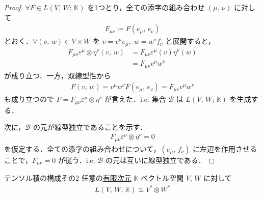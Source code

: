 \documentclass[rep_main]{subfiles}
\begin{document}
\begin{proof}
	$\forall F  \in L(V,\, W;\, \mathbb{K})$ を1つとり，全ての添字の組み合わせ $(\mu,\, \nu)$ に対して
	\begin{align}
		F_{\mu\nu} \coloneqq F(e_\mu,\, e_\nu)
	\end{align}
	とおく．$\forall (v,\, w) \in V \times W$ を $v = v^\mu e_\mu,\; w = w^\nu f_\nu$ と展開すると，
	\begin{align}
		F_{\mu\nu} \varepsilon^\mu \otimes \eta^\nu (v,\, w) &= F_{\mu\nu} \varepsilon^{\mu}(v) \eta^\nu(w) \\
		&= F_{\mu\nu} v^\mu w^\nu
	\end{align}
	が成り立つ．一方，双線型性から
	\begin{align}
		F(v,\, w) = v^\mu w^\nu F(e_\mu,\, e_\nu) = F_{\mu\nu} v^\mu w^\nu
	\end{align}
	も成り立つので $F = F_{\mu\nu} \varepsilon^\mu \otimes \eta^\nu$ が言えた．i.e. 集合 $\mathcal{B}$ は $L(V,\, W;\, \mathbb{K})$ を生成する．

	次に，$\mathcal{B}$ の元が線型独立であることを示す．
	\begin{align}
		F_{\mu\nu} \varepsilon^\mu \otimes \eta^\nu = 0
	\end{align}
	を仮定する．全ての添字の組み合わせについて，$(e_\mu,\, f_\nu)$ に左辺を作用させることで，$F_{\mu\nu} = 0$ が従う．i.e. $\mathcal{B}$ の元は互いに線型独立である．
\end{proof}


\begin{myprop}[label=prop:tensor-multillinear]{テンソル積の構成その2}
	任意の\underline{有限次元} $\mathbb{K}$-ベクトル空間 $V,\, W$ に対して
    \begin{align}
		L(V,\, W;\, \mathbb{K}) \cong V^* \otimes W^*
	\end{align}
\end{myprop}
\end{document}
